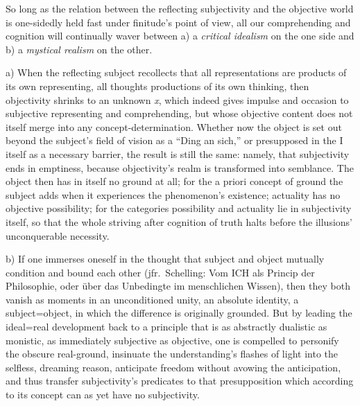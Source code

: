 \documentclass[12pt]{book}
\begin{document}
So long as the relation between the reflecting subjectivity and the
objective world is one-sidedly held fast under finitude's point of view, all
our comprehending and cognition will continually waver between a) a
\emph{critical idealism} on the one side and b) a \emph{mystical realism} on
the other.

a) When the reflecting subject recollects that all representations are
products of its own representing, all thoughts productions of its own
thinking, then objectivity shrinks to an unknown \textit{x}, which indeed
gives impulse and occasion to subjective representing and comprehending,
but whose objective content does not itself merge into any
concept-determination. Whether now the object is set out beyond the
subject's field of vision as a ``Ding an sich,'' or presupposed in the I
itself as a necessary barrier, the result is still the same: namely, that
subjectivity ends in emptiness, because objectivity's realm is transformed
into semblance. The object then has in itself no ground at all; for the a
priori concept of ground the subject adds when it experiences the
phenomenon's existence; actuality has no objective possibility; for the
categories possibility and actuality lie in subjectivity itself, so that the
whole striving after cognition of truth halts before the illusions'
unconquerable necessity.

b) If one immerses oneself in the thought that subject and object mutually
condition and bound each other (jfr.\ Schelling: Vom ICH als Princip der
Philosophie, oder über das Unbedingte im menschlichen Wissen), then they
both vanish as moments in an unconditioned unity, an absolute identity, a
subject=object, in which the difference is originally grounded. But by
leading the ideal=real development back to a principle that is as abstractly
dualistic as monistic, as immediately subjective as objective, one is
compelled to personify the obscure real-ground, insinuate the
understanding's flashes of light into the selfless, dreaming reason,
anticipate freedom without avowing the anticipation, and thus transfer
subjectivity's predicates to that presupposition which according to its
concept can as yet have no subjectivity.
\end{document}
